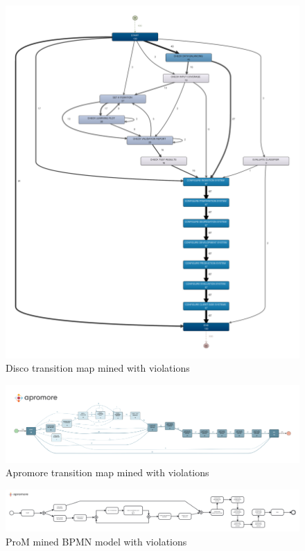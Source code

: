 \begin{figure}[H]
\centering
\includegraphics[width=\textwidth]{figures/disco_violations_map.pdf}
\caption{Disco transition map mined with violations}
\label{fig:disco_violations_map}
\end{figure}

\begin{figure}[H]
\centering
\includegraphics[width=\textwidth]{figures/apromore_violations_map.pdf}
\caption{Apromore transition map mined with violations}
\label{fig:apromore_violations_map}
\end{figure}

\begin{figure}[H]
\centering
\includegraphics[width=\textwidth]{figures/prom_violations_mined.pdf}
\caption{ProM mined BPMN model with violations}
\label{fig:prom_violations_mined}
\end{figure}

